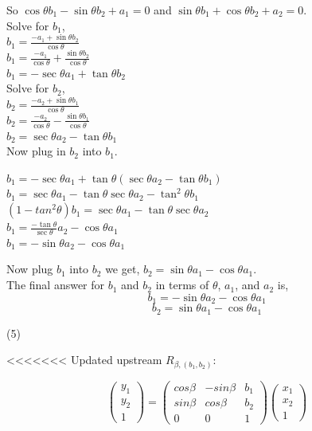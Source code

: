 \documentclass[12pt]{article}
\begin{document}
So $\cos\theta b_1 - \sin \theta b_2 + a_1 = 0$ and $\sin\theta b_1 + \cos\theta b_2 + a_2 = 0$. \\

Solve for $b_1$, \\
$b_1 = \frac{- a_1 +  \sin \theta b_2}{\cos\theta}$ \\
$b_1 = \frac{- a_1}{\cos\theta} + \frac{\sin \theta b_2}{\cos\theta}$ \\
$b_1 = -\sec\theta a_1 + \tan\theta b_2$ \\

Solve for $b_2$, \\
$b_2 = \frac{- a_2 +  \sin \theta b_1}{\cos\theta}$  \\
$b_2 = \frac{- a_2}{\cos\theta} - \frac{\sin \theta b_1}{\cos\theta}$ \\
$b_2 = \sec\theta a_2 - \tan\theta b_1$ \\

Now plug in $b_2$ into $b_1$.

$b_1 = -\sec\theta a_1 + \tan\theta (\sec\theta a_2 - \tan\theta b_1)$ \\
$b_1 = \sec\theta a_1 - \tan\theta \sec\theta a_2 - \tan^2\theta b_1$ \\
$(1-tan^2\theta)b_1 = \sec\theta a_1 - \tan\theta \sec\theta a_2 $ \\
$b_1 = \frac{-\tan \theta}{\sec \theta}a_2 - \cos \theta a_1$ \\
$b_1 = - \sin \theta a_2 - \cos \theta a_1$ 

Now plug $b_1$ into $b_2$ we get, 
$b_2 = \sin \theta a_1 - \cos \theta a_1$. \\

The final answer for $b_1$ and $b_2$ in terms of $\theta$, $a_1$, and $a_2$ is, 
$$b_1 = -\sin \theta a_2 - \cos \theta a_1$$
$$b_2 = \sin \theta a_1 - \cos \theta a_1$$

\medskip
(5)

<<<<<<< Updated upstream
$R_{\beta,(b_1,b_2)}:$

$$\begin{pmatrix}
y_1\\y_2\\1
\end{pmatrix}=\begin{pmatrix}
cos\beta & -sin\beta & b_1\\ sin\beta & cos\beta & b_2 \\ 0&0&1
\end{pmatrix}\begin{pmatrix}
x_1\\x_2\\1
\end{pmatrix}$$
\end{document}

